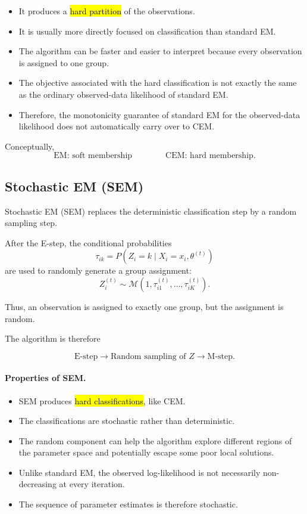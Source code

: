 \begin{itemize}
    \item It produces a \hl{hard partition} of the observations.
    \item It is usually more directly focused on classification than
    standard EM.
    \item The algorithm can be faster and easier to interpret because
    every observation is assigned to one group.
    \item The objective associated with the hard classification is not
    exactly the same as the ordinary observed-data likelihood of
    standard EM.
    \item Therefore, the monotonicity guarantee of standard EM for the
    observed-data likelihood does not automatically carry over to CEM.
\end{itemize}

Conceptually,
\[
\boxed{
\text{EM: soft membership}
\qquad\qquad
\text{CEM: hard membership}.
}
\]

\subsection{Stochastic EM (SEM)}

Stochastic EM (SEM) replaces the deterministic classification step by
a random sampling step.

After the E-step, the conditional probabilities
\[
\tau_{ik}
=
P(Z_i=k\mid X_i=x_i,\theta^{(t)})
\]
are used to randomly generate a group assignment:
\[
Z_i^{(t)}
\sim
\mathcal{M}
\left(
1,
\tau_{i1}^{(t)},\ldots,\tau_{iK}^{(t)}
\right).
\]

Thus, an observation is assigned to exactly one group, but the
assignment is random.

The algorithm is therefore

\[
\boxed{
\text{E-step}
\longrightarrow
\text{Random sampling of }Z
\longrightarrow
\text{M-step}.
}
\]

\paragraph{Properties of SEM.}

\begin{itemize}
    \item SEM produces \hl{hard classifications}, like CEM.
    \item The classifications are stochastic rather than deterministic.
    \item The random component can help the algorithm explore
    different regions of the parameter space and potentially escape
    some poor local solutions.
    \item Unlike standard EM, the observed log-likelihood is not
    necessarily non-decreasing at every iteration.
    \item The sequence of parameter estimates is therefore stochastic.
\end{itemize}

